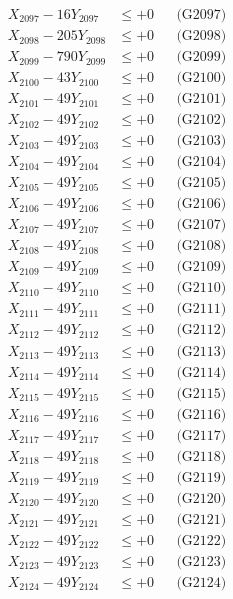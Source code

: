 \documentclass[a4paper,10pt]{article}
\begin{document}
{\begin{align}
X_{2097} - 16Y_{2097} &\leq +0 && \text{(G2097)} \\
X_{2098} - 205Y_{2098} &\leq +0 && \text{(G2098)} \\
X_{2099} - 790Y_{2099} &\leq +0 && \text{(G2099)} \\
X_{2100} - 43Y_{2100} &\leq +0 && \text{(G2100)} \\
\allowbreak
X_{2101} - 49Y_{2101} &\leq +0 && \text{(G2101)} \\
X_{2102} - 49Y_{2102} &\leq +0 && \text{(G2102)} \\
X_{2103} - 49Y_{2103} &\leq +0 && \text{(G2103)} \\
X_{2104} - 49Y_{2104} &\leq +0 && \text{(G2104)} \\
X_{2105} - 49Y_{2105} &\leq +0 && \text{(G2105)} \\
X_{2106} - 49Y_{2106} &\leq +0 && \text{(G2106)} \\
X_{2107} - 49Y_{2107} &\leq +0 && \text{(G2107)} \\
X_{2108} - 49Y_{2108} &\leq +0 && \text{(G2108)} \\
X_{2109} - 49Y_{2109} &\leq +0 && \text{(G2109)} \\
X_{2110} - 49Y_{2110} &\leq +0 && \text{(G2110)} \\
\allowbreak
X_{2111} - 49Y_{2111} &\leq +0 && \text{(G2111)} \\
X_{2112} - 49Y_{2112} &\leq +0 && \text{(G2112)} \\
X_{2113} - 49Y_{2113} &\leq +0 && \text{(G2113)} \\
X_{2114} - 49Y_{2114} &\leq +0 && \text{(G2114)} \\
X_{2115} - 49Y_{2115} &\leq +0 && \text{(G2115)} \\
X_{2116} - 49Y_{2116} &\leq +0 && \text{(G2116)} \\
X_{2117} - 49Y_{2117} &\leq +0 && \text{(G2117)} \\
X_{2118} - 49Y_{2118} &\leq +0 && \text{(G2118)} \\
X_{2119} - 49Y_{2119} &\leq +0 && \text{(G2119)} \\
X_{2120} - 49Y_{2120} &\leq +0 && \text{(G2120)} \\
\allowbreak
X_{2121} - 49Y_{2121} &\leq +0 && \text{(G2121)} \\
X_{2122} - 49Y_{2122} &\leq +0 && \text{(G2122)} \\
X_{2123} - 49Y_{2123} &\leq +0 && \text{(G2123)} \\
X_{2124} - 49Y_{2124} &\leq +0 && \text{(G2124)} \\

\end{align}}
\end{document}
